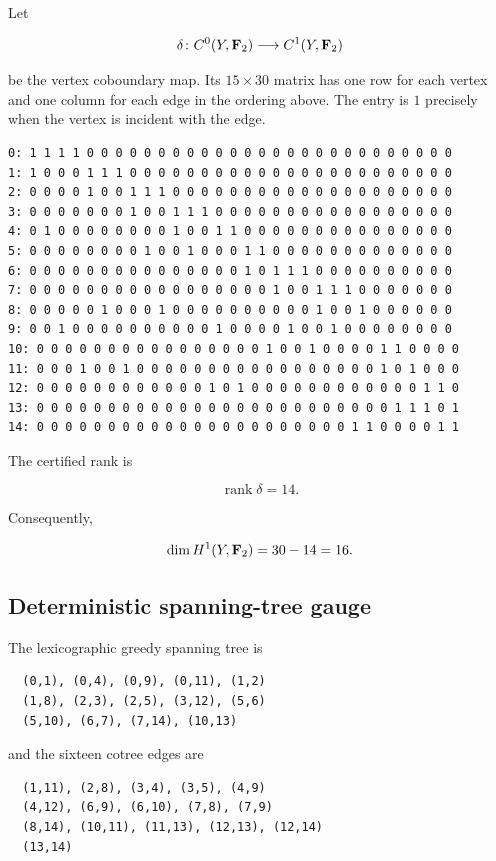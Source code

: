 Let

\[
\delta\colon C^0(Y,\mathbf F_2)\longrightarrow C^1(Y,\mathbf F_2)
\]

be the vertex coboundary map. Its \(15\times30\) matrix has one row for
each vertex and one column for each edge in the ordering above. The
entry is \(1\) precisely when the vertex is incident with the edge.

\begin{verbatim}
0: 1 1 1 1 0 0 0 0 0 0 0 0 0 0 0 0 0 0 0 0 0 0 0 0 0 0 0 0 0 0
1: 1 0 0 0 1 1 1 0 0 0 0 0 0 0 0 0 0 0 0 0 0 0 0 0 0 0 0 0 0 0
2: 0 0 0 0 1 0 0 1 1 1 0 0 0 0 0 0 0 0 0 0 0 0 0 0 0 0 0 0 0 0
3: 0 0 0 0 0 0 0 1 0 0 1 1 1 0 0 0 0 0 0 0 0 0 0 0 0 0 0 0 0 0
4: 0 1 0 0 0 0 0 0 0 0 1 0 0 1 1 0 0 0 0 0 0 0 0 0 0 0 0 0 0 0
5: 0 0 0 0 0 0 0 0 1 0 0 1 0 0 0 1 1 0 0 0 0 0 0 0 0 0 0 0 0 0
6: 0 0 0 0 0 0 0 0 0 0 0 0 0 0 0 1 0 1 1 1 0 0 0 0 0 0 0 0 0 0
7: 0 0 0 0 0 0 0 0 0 0 0 0 0 0 0 0 0 1 0 0 1 1 1 0 0 0 0 0 0 0
8: 0 0 0 0 0 1 0 0 0 1 0 0 0 0 0 0 0 0 0 0 1 0 0 1 0 0 0 0 0 0
9: 0 0 1 0 0 0 0 0 0 0 0 0 0 1 0 0 0 0 1 0 0 1 0 0 0 0 0 0 0 0
10: 0 0 0 0 0 0 0 0 0 0 0 0 0 0 0 0 1 0 0 1 0 0 0 0 1 1 0 0 0 0
11: 0 0 0 1 0 0 1 0 0 0 0 0 0 0 0 0 0 0 0 0 0 0 0 0 1 0 1 0 0 0
12: 0 0 0 0 0 0 0 0 0 0 0 0 1 0 1 0 0 0 0 0 0 0 0 0 0 0 0 1 1 0
13: 0 0 0 0 0 0 0 0 0 0 0 0 0 0 0 0 0 0 0 0 0 0 0 0 0 1 1 1 0 1
14: 0 0 0 0 0 0 0 0 0 0 0 0 0 0 0 0 0 0 0 0 0 0 1 1 0 0 0 0 1 1
\end{verbatim}

The certified rank is

\[
\operatorname{rank}\delta=14.
\]

Consequently,

\[
\dim H^1(Y,\mathbf F_2)
=
30-14
=
16.
\]

\subsection{Deterministic spanning-tree gauge}

The lexicographic greedy spanning tree is

\begin{verbatim}
  (0,1), (0,4), (0,9), (0,11), (1,2)
  (1,8), (2,3), (2,5), (3,12), (5,6)
  (5,10), (6,7), (7,14), (10,13)
\end{verbatim}

and the sixteen cotree edges are

\begin{verbatim}
  (1,11), (2,8), (3,4), (3,5), (4,9)
  (4,12), (6,9), (6,10), (7,8), (7,9)
  (8,14), (10,11), (11,13), (12,13), (12,14)
  (13,14)
\end{verbatim}

